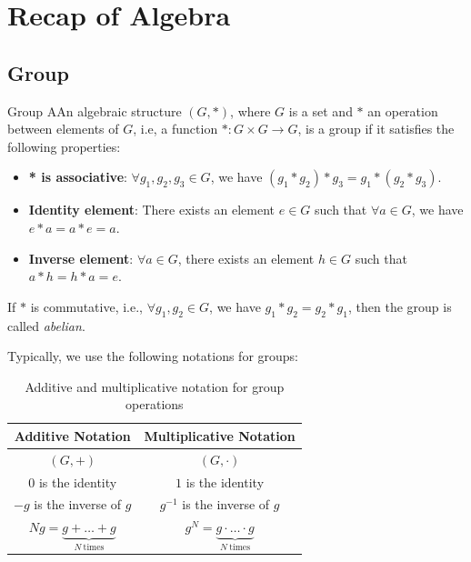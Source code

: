 \section{Recap of Algebra}

\subsection{Group}
\begin{defBox}{Group}
AAn algebraic structure $(G, *)$, where $G$ is a set and $*$ an operation between elements of $G$, i.e, a function $* : G \times G \to G$, is a group if it satisfies the following properties:
\begin{itemize}
    \item \textbf{* is associative}: $\forall g_1, g_2, g_3 \in G$, we have $(g_1 * g_2) * g_3 = g_1 * (g_2 * g_3)$.
    \item \textbf{Identity element}: There exists an element $e \in G$ such that $\forall a \in G$, we have $e * a = a * e = a$.
    \item \textbf{Inverse element}: $ \forall a \in G$, there exists an element $h \in G$ such that $a * h = h * a = e$.
\end{itemize}
\end{defBox}

\noindent
If $*$ is commutative, i.e., $\forall g_1, g_2 \in G$, we have $g_1 * g_2 = g_2 * g_1$, then the group is called \textit{abelian}.

\bigskip

\noindent
Typically, we use the following notations for groups:

\begin{table}[H]
\centering
\begin{tabular}{cc}
\toprule
\textbf{Additive Notation} & \textbf{Multiplicative Notation} \\
\midrule

$(G, +)$ & $(G, \cdot)$ \\[6pt]

$0$ is the identity & $1$ is the identity \\[6pt]

$-g$ is the inverse of $g$ & $g^{-1}$ is the inverse of $g$ \\[6pt]

$Ng = \underbrace{g + \dots + g}_{N\ \text{times}}$
&
$g^N = \underbrace{g \cdot \dots \cdot g}_{N\ \text{times}}$

\\
\bottomrule
\end{tabular}
\caption{Additive and multiplicative notation for group operations}
\end{table}

